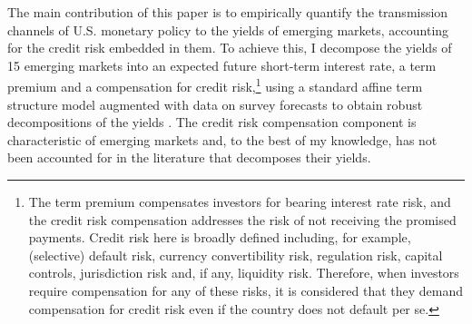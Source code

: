 {The main contribution of this paper is to empirically quantify the transmission channels of U.S. monetary policy to the yields of emerging markets, accounting for the credit risk embedded in them.
To achieve this, I decompose the yields of 15 emerging markets into an expected future short-term interest rate, a term premium and a compensation for credit risk,\footnote{ The term premium compensates investors for bearing interest rate risk, and the credit risk compensation addresses the risk of not receiving the promised payments. Credit risk here is broadly defined including, for example, (selective) default risk, currency convertibility risk, regulation risk, capital controls, jurisdiction risk and, if any, liquidity risk. Therefore, when investors require compensation for any of these risks, it is considered that they demand compensation for credit risk even if the country does not default per se.} 
using a standard affine term structure model augmented with data on survey forecasts to obtain robust decompositions of the yields \citep{Guimaraes:2014}.
The credit risk compensation component is characteristic of emerging markets and, to the best of my knowledge, has not been accounted for in the literature that decomposes their yields.
}

